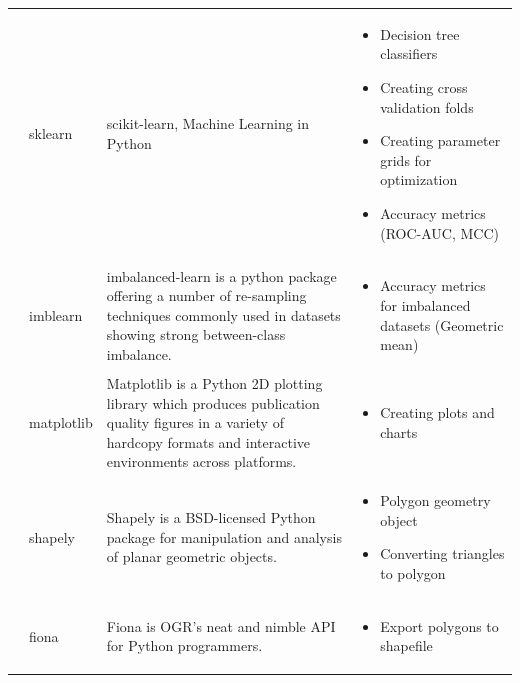 \begin{longtable}{ p{} p{} p{} }
	\addlinespace
	\ \ sklearn & scikit-learn, Machine Learning in Python &
	\begin{minipage}[t]{0.3\textwidth}
		\begin{itemize}[leftmargin=*,noitemsep]
			\item Decision tree classifiers
			\item Creating cross validation folds
			\item Creating parameter grids for optimization
			\item Accuracy metrics (ROC-AUC, MCC)
		\end{itemize}
	\end{minipage}\\

	\addlinespace
	\ \ imblearn & imbalanced-learn is a python package offering a number of re-sampling techniques commonly used in datasets showing strong between-class imbalance. &
	\begin{minipage}[t]{0.3\textwidth}
		\begin{itemize}[leftmargin=*,noitemsep]
			\item Accuracy metrics for imbalanced datasets (Geometric mean)
		\end{itemize}
	\end{minipage}\\

	\addlinespace
	\ \ matplotlib & Matplotlib is a Python 2D plotting library which produces publication quality figures in a variety of hardcopy formats and interactive environments across platforms. &
	\begin{minipage}[t]{0.3\textwidth}
		\begin{itemize}[leftmargin=*,noitemsep]
			\item Creating plots and charts
		\end{itemize}
	\end{minipage}\\

	\addlinespace
	\ \ shapely & Shapely is a BSD-licensed Python package for manipulation and analysis of planar geometric objects. &
	\begin{minipage}[t]{0.3\textwidth}
		\begin{itemize}[leftmargin=*,noitemsep]
			\item Polygon geometry object
			\item Converting triangles to polygon
		\end{itemize}
	\end{minipage}\\

	\addlinespace
	\ \ fiona & Fiona is OGR's neat and nimble API for Python programmers. &
	\begin{minipage}[t]{0.3\textwidth}
		\begin{itemize}[leftmargin=*,noitemsep]
			\item Export polygons to shapefile
		\end{itemize}
	\end{minipage}\\

\end{longtable}


